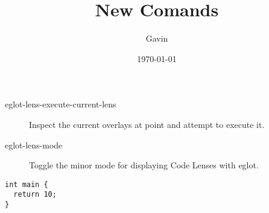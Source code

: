 \documentclass[11pt]{article}
\author{Gavin}
\date{\today}
\title{New Comands}
\begin{document}
\maketitle
\begin{description}
\item[{eglot-lens-execute-current-lens}] Inspect the current overlays at point and attempt to execute it.
\item[{eglot-lens-mode}] Toggle the minor mode for displaying Code Lenses with eglot.
\end{description}

\begin{verbatim}
int main {
  return 10;
}
\end{verbatim}
\end{document}
